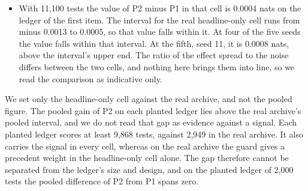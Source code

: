 \begin{itemize}
\item With 11,100 tests the value of P2 minus P1 in that cell is 0.0004 nats on the ledger of the first item. The interval for the real headline-only cell runs from minus 0.0013 to 0.0005, so that value falls within it.
At four of the five seeds the value falls within that interval. At the fifth, seed 11, it is 0.0008 nats, above the interval's upper end. The ratio of the effect spread to the noise differs between the two cells, and nothing here brings them into line, so we read the comparison as indicative only.
\end{itemize}
We set only the headline-only cell against the real archive, and not the pooled figure. The pooled gain of P2 on each planted ledger lies above the real archive's pooled interval, and we do not read that gap as evidence against a signal. Each planted ledger scores at least 9,868 tests, against 2,949 in the real archive. It also carries the signal in every cell, whereas on the real archive the guard gives a precedent weight in the headline-only cell alone. The gap therefore cannot be separated from the ledger's size and design, and on the planted ledger of 2,000 tests the pooled difference of P2 from P1 spans zero.

